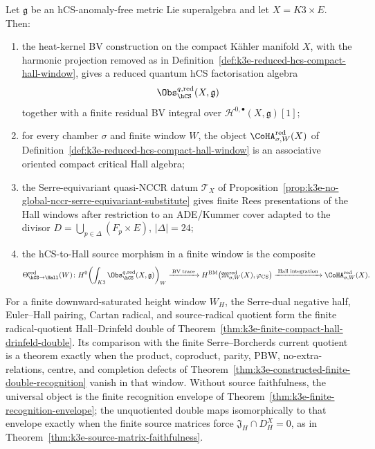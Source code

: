 \begin{theorem}
\label{thm:k3e-reduced-compact-source-finite-hall-windows}
Let \(\mathfrak g\) be an hCS-anomaly-free metric Lie superalgebra and
let \(X=K3\times E\).  Then:
\begin{enumerate}[label=\emph{(\roman*)}, leftmargin=2em]
\item the heat-kernel BV construction on the compact K\"ahler manifold
 \(X\), with the harmonic projection removed as in
 Definition~\ref{def:k3e-reduced-hcs-compact-hall-window}, gives a
 reduced quantum hCS factorisation algebra
 \[
  \Obs_{\hCS}^{q,\mathrm{red}}(X,\mathfrak g)
 \]
 together with a finite residual BV integral over
 \(\mathcal H^{0,\bullet}(X,\mathfrak g)[1]\);
\item for every chamber \(\sigma\) and finite window \(W\), the object
 \(\CoHA_{\sigma,W}^{\mathrm{red}}(X)\) of
 Definition~\ref{def:k3e-reduced-hcs-compact-hall-window} is an
 associative oriented compact critical Hall algebra;
\item the Serre-equivariant quasi-NCCR datum
 \(\mathcal T_X\) of
 Proposition~\ref{prop:k3e-no-global-nccr-serre-equivariant-substitute}
 gives finite Rees presentations of the Hall windows after restriction
 to an ADE/Kummer cover adapted to the divisor
 \(D=\bigcup_{p\in\Delta}(F_p\times E)\), \(|\Delta|=24\);
\item the hCS-to-Hall source morphism in a finite window is the composite
 \[
 \Theta_{\hCS\to\Hall}^{\mathrm{red}}(W)\colon
 H^0\!\left(\int_{K3}
 \Obs_{\hCS}^{q,\mathrm{red}}(X,\mathfrak g)\right)_W
 \xrightarrow{\;\mathrm{BV\;trace}\;}
 H^{\mathrm{BM}}\!\left(
 \mathfrak M_{\sigma,W}^{\mathrm{red}}(X),\varphi_{\mathrm{CS}}
 \right)
 \xrightarrow{\;\mathrm{Hall\;integration}\;}
 \CoHA_{\sigma,W}^{\mathrm{red}}(X).
 \]
\end{enumerate}
For a finite downward-saturated height window \(W_H\), the
Serre-dual negative half, Euler--Hall pairing, Cartan radical, and
source-radical quotient form the finite radical-quotient
Hall--Drinfeld double of
Theorem~\ref{thm:k3e-finite-compact-hall-drinfeld-double}.  Its
comparison with the finite Serre--Borcherds current quotient is a
theorem exactly when the product, coproduct, parity, PBW,
no-extra-relations, centre, and completion defects of
Theorem~\ref{thm:k3e-constructed-finite-double-recognition} vanish in
that window. Without source faithfulness, the universal object is the
finite recognition envelope of
Theorem~\ref{thm:k3e-finite-recognition-envelope}; the unquotiented
double maps isomorphically to that envelope exactly when the finite
source matrices force
\(\mathfrak J_H\cap D_H^X=0\), as in
Theorem~\ref{thm:k3e-source-matrix-faithfulness}.
\end{theorem}

